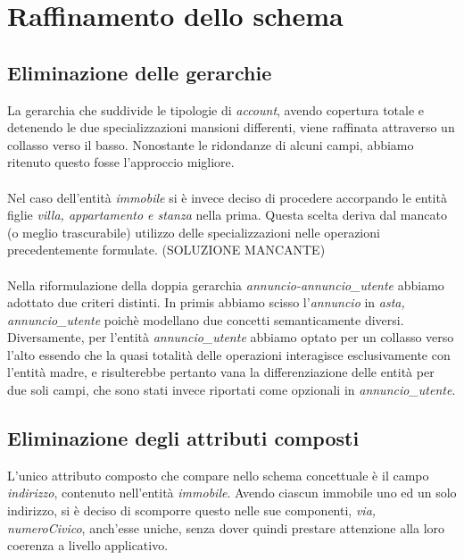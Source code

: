 \documentclass[a4paper,12pt]{report}
\begin{document}
        \section{Raffinamento dello schema}
            \subsection*{Eliminazione delle gerarchie}
                La gerarchia che suddivide le tipologie di \textit{account}, avendo copertura totale e
                detenendo le due specializzazioni mansioni differenti, viene raffinata
                attraverso un collasso verso il basso. Nonostante le ridondanze di alcuni campi,
                abbiamo ritenuto questo fosse l'approccio migliore.\\
                \\
                Nel caso dell'entità \textit{immobile} si è invece deciso di procedere accorpando le
                entità figlie \textit{villa, appartamento e stanza} nella prima. Questa scelta deriva
                dal mancato (o meglio trascurabile) utilizzo delle specializzazioni nelle operazioni
                precedentemente formulate. (SOLUZIONE MANCANTE)\\
                \\
                Nella riformulazione della doppia gerarchia \textit{annuncio-annuncio\_utente} abbiamo
                adottato due criteri distinti. In primis abbiamo scisso l'\textit{annuncio} in 
                \textit{asta, annuncio\_utente} poichè modellano due concetti semanticamente diversi.
                Diversamente, per l'entità \textit{annuncio\_utente} abbiamo optato per un collasso verso
                l'alto essendo che la quasi totalità delle operazioni interagisce esclusivamente con l'entità 
                madre, e risulterebbe pertanto vana la differenziazione delle entità per due soli campi, che 
                sono stati invece riportati come opzionali in \textit{annuncio\_utente}.


            \subsection*{Eliminazione degli attributi composti}
            L'unico attributo composto che compare nello schema concettuale è il campo \textit{indirizzo},
            contenuto nell'entità \textit{immobile}. Avendo ciascun immobile uno ed un solo indirizzo,
            si è deciso di scomporre questo nelle sue componenti, \textit{via, numeroCivico}, anch'esse uniche, senza dover quindi 
            prestare attenzione alla loro coerenza a livello applicativo.
\end{document}
